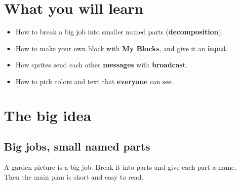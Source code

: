 
\section{What you will learn}
\begin{itemize}[leftmargin=1.2em,itemsep=1pt]
  \item How to break a big job into smaller named parts (\textbf{decomposition}).
  \item How to make your own block with \textbf{My Blocks}, and give it an \textbf{input}.
  \item How sprites send each other \textbf{messages} with \textbf{broadcast}.
  \item How to pick colors and text that \textbf{everyone} can see.
\end{itemize}

\section{The big idea}
\subsection{Big jobs, small named parts}
A garden picture is a big job. Break it into parts and give each part a name. Then the main plan is short and easy to read.

\begin{center}
\end{center}


